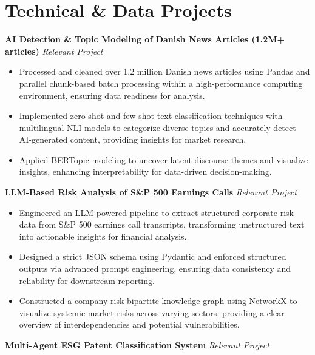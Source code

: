 \documentclass[10pt, letterpaper]{article}
\begin{document}
\section{Technical \& Data Projects}
\noindent\textbf{AI Detection \& Topic Modeling of Danish News Articles (1.2M+ articles)} \hfill \textit{Relevant Project}\\
\begin{itemize}[leftmargin=0.15in, topsep=0pt, partopsep=0pt, itemsep=-2pt]
    \item Processed and cleaned over 1.2 million Danish news articles using Pandas and parallel chunk-based batch processing within a high-performance computing environment, ensuring data readiness for analysis.
    \item Implemented zero-shot and few-shot text classification techniques with multilingual NLI models to categorize diverse topics and accurately detect AI-generated content, providing insights for market research.
    \item Applied BERTopic modeling to uncover latent discourse themes and visualize insights, enhancing interpretability for data-driven decision-making.
\end{itemize}
\vspace{4pt}
\noindent\textbf{LLM-Based Risk Analysis of S\&P 500 Earnings Calls} \hfill \textit{Relevant Project}\\
\begin{itemize}[leftmargin=0.15in, topsep=0pt, partopsep=0pt, itemsep=-2pt]
    \item Engineered an LLM-powered pipeline to extract structured corporate risk data from S\&P 500 earnings call transcripts, transforming unstructured text into actionable insights for financial analysis.
    \item Designed a strict JSON schema using Pydantic and enforced structured outputs via advanced prompt engineering, ensuring data consistency and reliability for downstream reporting.
    \item Constructed a company-risk bipartite knowledge graph using NetworkX to visualize systemic market risks across varying sectors, providing a clear overview of interdependencies and potential vulnerabilities.
\end{itemize}
\vspace{4pt}
\noindent\textbf{Multi-Agent ESG Patent Classification System} \hfill \textit{Relevant Project}\\
\end{document}
